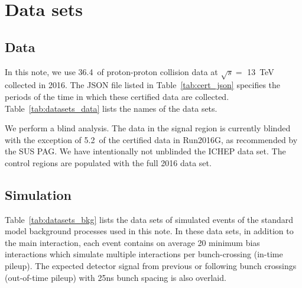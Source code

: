 \section{Data sets}
\label{sec:datasets}

\subsection{Data}


In this note, we use 36.4~\ifb of proton-proton collision data at
$\sqrt{s} =$ 13~TeV collected in 2016. The JSON file listed in
Table~\ref{tab:cert_json} specifies the periods of the time in which
these certified data are collected. Table~\ref{tab:datasets_data} lists
the names of the data sets.

We perform a blind analysis. The data in the signal region is
currently blinded with the exception of 5.2~\ifb of the certified data
in Run2016G, as recommended by the SUS PAG. We have intentionally not
unblinded the ICHEP data set. The control regions are populated with
the full 2016 data set.

\begin{table}[!h]
\footnotesize
 
\label{tab:cert_json}
\end{table}

\begin{table}[!h]
\footnotesize 
\label{tab:datasets_data}
\end{table}


\subsection{Simulation}

Table~\ref{tab:datasets_bkg} lists the data sets of simulated events
of the standard model background processes used in this note. In these
data sets, in addition to the main interaction, each event contains on
average 20 minimum bias interactions which simulate multiple
interactions per bunch-crossing (in-time pileup). The expected
detector signal from previous or following bunch crossings
(out-of-time pileup) with 25ns bunch spacing is also overlaid.

